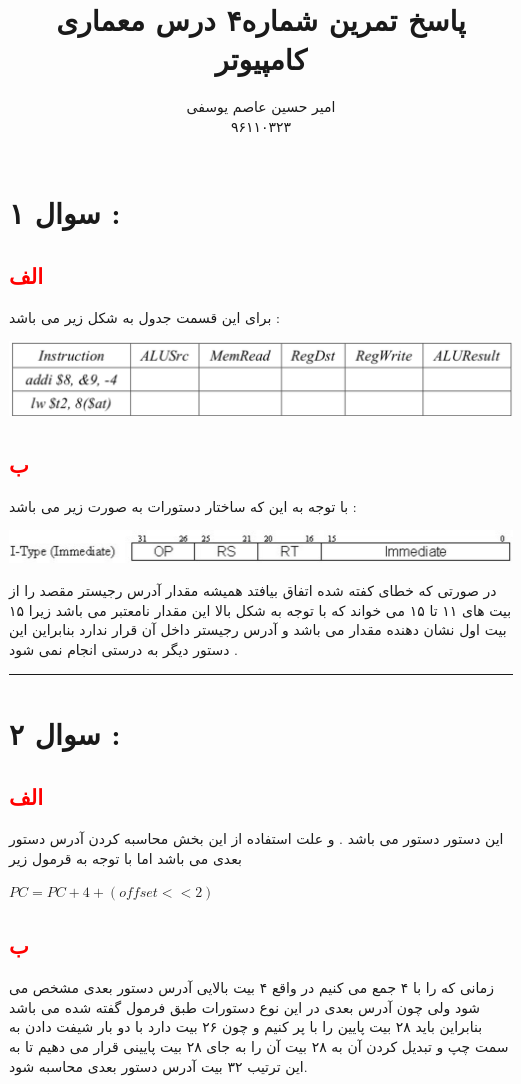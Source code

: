 \documentclass{article}
\title{پاسخ تمرین شماره۴ درس معماری کامپیوتر}
\author{امیر حسین عاصم یوسفی \\ ۹۶۱۱۰۳۲۳}
\begin{document}
	\maketitle
	\section*{سوال ۱  : }
	\subsection*{\textcolor{red}{الف}}
	برای این قسمت جدول به شکل زیر می باشد  : 
	\begin{center}
	\includegraphics[width=1\textwidth]{table1}
	\end{center}

\subsection*{\textcolor{red}{ب}}
با توجه به این که  ساختار دستورات 
به صورت زیر می باشد  : 
	\begin{center}
	\includegraphics[width=1\textwidth]{itype}
\end{center}
در صورتی که خطای کفته شده اتفاق بیافتد همیشه مقدار آدرس رجیستر مقصد را از بیت های ۱۱ تا ۱۵ می خواند که با توجه به شکل بالا این مقدار نامعتبر می باشد زیرا ۱۵ بیت اول نشان دهنده مقدار 
می باشد و آدرس رجیستر داخل آن قرار ندارد بنابراین این دستور دیگر به  درستی انجام نمی شود  . 
\hrule
\section*{سوال ۲  : }
\subsection*{\textcolor{red}{الف}}
این دستور دستور 
\lr{\textcolor{red}{beq}}
می باشد  . و علت استفاده از این بخش محاسبه کردن آدرس دستور بعدی می باشد اما با توجه به قرمول زیر 
\begin{center}
	$PC  = PC + 4 + (offset <<2 )$
\end{center}
\subsection*{\textcolor{red}{ب}}
زمانی که 
را با ۴ جمع می کنیم در واقع ۴ بیت بالایی آدرس دستور بعدی مشخص می شود ولی چون آدرس بعدی در این نوع دستورات طبق فرمول گفته شده می باشد بنابراین باید ۲۸ بیت پایین 
را با 
پر کنیم و چون 
۲۶ بیت دارد با دو بار شیفت دادن به سمت چپ و تبدیل کردن آن به ۲۸ بیت آن را به جای ۲۸ بیت پایینی 
قرار می دهیم تا به این ترتیب ۳۲ بیت آدرس دستور بعدی محاسبه شود. 
\end{document}
